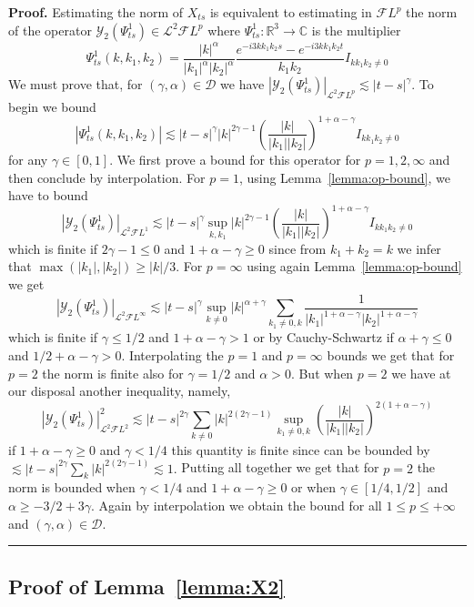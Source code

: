 \documentclass[a4paper,11pt,reqno]{article}
\newcommand{\RR}{\mathbb{R}}
\newcommand{\bbC}{\mathbb{C}}
\newcommand{\DD}{\mathcal{D}}
\newcommand{\FF}{\mathcal{F}}
\newcommand{\LL}{\mathcal{L}}
\newcommand{\YY}{\mathcal{Y}}
\newenvironment{proof}[1][Proof]{\textbf{#1.} }{\ \rule{0.5em}{0.5em}}
\begin{document}
\begin{proof} 
Estimating the norm of $X_{ts}$ is equivalent to estimating in $\FF L^p$ the norm of the operator $\YY_2(\Psi^1_{ts})\in \LL^2\FF L^p$ where $\Psi^1_{ts}: \RR^3\to \bbC$ is the multiplier
$$
\Psi^1_{ts}(k,k_1,k_2) =  \frac{|k|^{\alpha}}{|k_1|^\alpha |k_2|^\alpha} \frac{e^{-i 3 k k_1 k_2
      s}-e^{-i 3 k k_1 k_2 t}}{k_1 k_2} I_{kk_1k_2 \neq 0 }
$$ 
We must prove that, for $(\gamma,\alpha) \in \DD$ we have 
$|\YY_2(\Psi^1_{ts})|_{\LL^2 \FF L^p} \lesssim |t-s|^\gamma
$.
To begin we bound 
$$
|\Psi^1_{ts}(k,k_1,k_2)| \lesssim |t-s|^\gamma |k|^{2\gamma-1} \left(\frac{|k|}{|k_1| |k_2|}\right)^{1+\alpha-\gamma}  I_{kk_1k_2 \neq 0 }
$$
for any $\gamma \in[0,1]$.
We first prove a bound for this operator for $p=1,2,\infty$ and then conclude by interpolation.
For $p=1$, using Lemma~\ref{lemma:op-bound},  we have to bound 
$$
|\YY_2(\Psi^1_{ts})|_{\LL^2 \FF L^1}\lesssim
|t-s|^\gamma \sup_{k,k_1} 
 |k|^{2\gamma-1} \left(\frac{|k|}{|k_1| |k_2|}\right)^{1+\alpha-\gamma} I_{kk_1k_2 \neq 0 } $$
which is finite if $2\gamma-1 \le 0$ and $1+\alpha-\gamma\ge 0$ since from $k_1+k_2 = k$ we infer that $\max(|k_1|,|k_2|) \ge |k|/3$.
For $p=\infty$ using again Lemma~\ref{lemma:op-bound} we get
$$
|\YY_2(\Psi^1_{ts})|_{\LL^2 \FF L^\infty}\lesssim
|t-s|^\gamma \sup_{k \neq 0} |k|^{\alpha+\gamma} \sum_{k_1 \neq 0,k} 
  \frac{1}{|k_1|^{1+\alpha-\gamma} |k_2|^{1+\alpha-\gamma}}
 $$
which is finite if $\gamma\le 1/2$ and $1+\alpha-\gamma>1$ or by Cauchy-Schwartz if $\alpha+\gamma\le 0$ and $1/2+\alpha-\gamma > 0$. 
Interpolating the $p=1$ and $p=\infty$ bounds we get that for $p=2$ the norm is finite also for $\gamma=1/2$ and $\alpha > 0$. But when $p=2$ we have at our disposal another inequality, namely,
$$
|\YY_2(\Psi^1_{ts})|_{\LL^2 \FF L^2}^2 \lesssim
|t-s|^{2\gamma} \sum_{k\neq 0} |k|^{2(2\gamma-1)}\sup_{k_1 \neq 0,k} \left(\frac{|k|}{|k_1| |k_2|}\right)^{2(1+\alpha-\gamma)} 
$$
if $1+\alpha-\gamma\ge 0$ and $\gamma < 1/4$ this quantity is finite since can be bounded by
$
 \lesssim
|t-s|^{2\gamma} \sum_k |k|^{2(2\gamma-1)} \lesssim 1  .
$
Putting all together we get that for $p=2$ the norm is bounded when $\gamma < 1/4$ and $1+\alpha-\gamma\ge 0$ or when $\gamma\in[1/4,1/2]$ and $\alpha \ge -3/2+3 \gamma$.
Again by interpolation we obtain the bound for all $1 \le p \le +\infty$ and $(\gamma,\alpha) \in \DD$.
\end{proof}



\subsection{Proof of Lemma~\ref{lemma:X2}}
\end{document}
